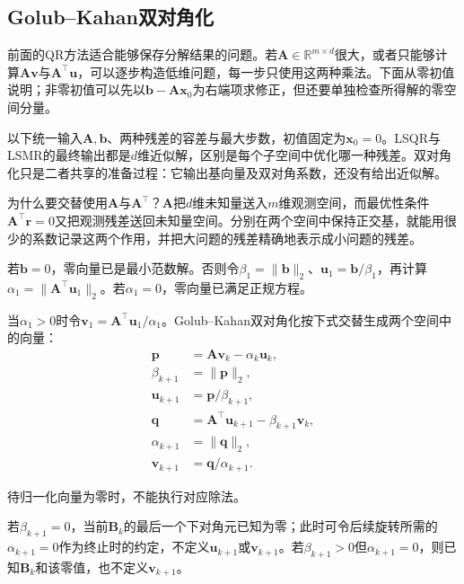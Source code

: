 \subsection{Golub--Kahan双对角化}
\label{sec:ls-bidiagonal-iteration}

前面的QR方法适合能够保存分解结果的问题。若$\bm A\in\mathbb R^{m\times d}$很大，或者只能够计算$\bm A\bm v$与$\bm A^\top\bm u$，可以逐步构造低维问题，每一步只使用这两种乘法。下面从零初值说明；非零初值可以先以$\bm b-\bm A\bm x_0$为右端项求修正，但还要单独检查所得解的零空间分量。

以下统一输入$\bm A,\bm b$、两种残差的容差与最大步数，初值固定为$\bm x_0=0$。LSQR与LSMR的最终输出都是$d$维近似解，区别是每个子空间中优化哪一种残差。双对角化只是二者共享的准备过程：它输出基向量及双对角系数，还没有给出近似解。

为什么要交替使用$\bm A$与$\bm A^\top$？$\bm A$把$d$维未知量送入$m$维观测空间，而最优性条件$\bm A^\top\bm r=0$又把观测残差送回未知量空间。分别在两个空间中保持正交基，就能用很少的系数记录这两个作用，并把大问题的残差精确地表示成小问题的残差。

若$\bm b=0$，零向量已是最小范数解。否则令$\beta_1=\lVert\bm b\rVert_2$、$\bm u_1=\bm b/\beta_1$，再计算$\alpha_1=\lVert\bm A^\top\bm u_1\rVert_2$。若$\alpha_1=0$，零向量已满足正规方程。

当$\alpha_1>0$时令$\bm v_1=\bm A^\top\bm u_1/\alpha_1$。Golub--Kahan双对角化按下式交替生成两个空间中的向量：
\begin{align*}
 \bm p&=\bm A\bm v_k-\alpha_k\bm u_k,\\
 \beta_{k+1}&=\lVert\bm p\rVert_2,\\
 \bm u_{k+1}&=\bm p/\beta_{k+1},\\
 \bm q&=\bm A^\top\bm u_{k+1}-\beta_{k+1}\bm v_k,\\
 \alpha_{k+1}&=\lVert\bm q\rVert_2,\\
 \bm v_{k+1}&=\bm q/\alpha_{k+1}.
\end{align*}

待归一化向量为零时，不能执行对应除法。

若$\beta_{k+1}=0$，当前$\bm B_k$的最后一个下对角元已知为零；此时可令后续旋转所需的$\alpha_{k+1}=0$作为终止时的约定，不定义$\bm u_{k+1}$或$\bm v_{k+1}$。若$\beta_{k+1}>0$但$\alpha_{k+1}=0$，则已知$\bm B_k$和该零值，也不定义$\bm v_{k+1}$。

